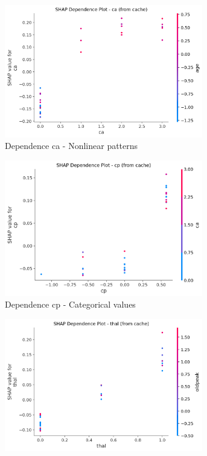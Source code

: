 \begin{figure}[H]
\centering
\begin{subfigure}[b]{0.31\textwidth}
\centering
\includegraphics[width=0.95\textwidth]{Result/cleveland_dataset/Catboost/SHAP/Dependence CA.png}
\caption{Dependence ca - Nonlinear patterns}
\label{fig:dependence_ca_clean}
\end{subfigure}
\hfill
\begin{subfigure}[b]{0.31\textwidth}
\centering
\includegraphics[width=0.95\textwidth]{Result/cleveland_dataset/Catboost/SHAP/Dependence CP.png}
\caption{Dependence cp - Categorical values}
\label{fig:dependence_cp_clean}
\end{subfigure}
\hfill
\begin{subfigure}[b]{0.31\textwidth}
\centering
\includegraphics[width=0.95\textwidth]{Result/cleveland_dataset/Catboost/SHAP/Dependence thal.png}

\end{subfigure}
\end{figure}
